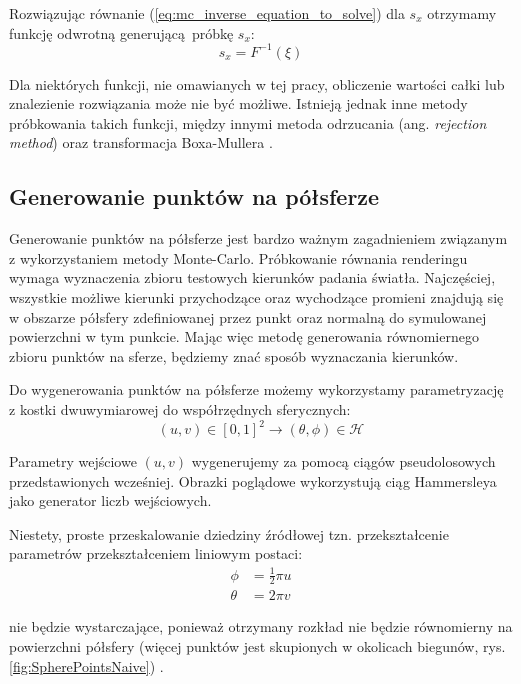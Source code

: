 \documentclass[../main.tex]{subfiles}
\begin{document}
Rozwiązując równanie (\ref{eq:mc_inverse_equation_to_solve}) dla $s_x$ otrzymamy funkcję odwrotną generującą próbkę $s_x$:
\begin{equation}
s_x = F^{-1}(\xi)
\end{equation}

Dla niektórych funkcji, nie omawianych w tej pracy, obliczenie wartości całki lub znalezienie rozwiązania może nie być możliwe. Istnieją jednak inne metody próbkowania takich funkcji, między innymi metoda odrzucania (ang. \textit{rejection method}) oraz transformacja Boxa-Mullera \cite{pbrt}.

\subsection{Generowanie punktów na półsferze}

Generowanie punktów na półsferze jest bardzo ważnym zagadnieniem związanym z wykorzystaniem metody Monte-Carlo. Próbkowanie równania renderingu wymaga wyznaczenia zbioru testowych kierunków padania światła. Najczęściej, wszystkie możliwe kierunki przychodzące oraz wychodzące promieni znajdują się w obszarze półsfery zdefiniowanej przez punkt oraz normalną do symulowanej powierzchni w tym punkcie. Mając więc metodę generowania równomiernego zbioru punktów na sferze, będziemy znać sposób wyznaczania kierunków.

Do wygenerowania punktów na półsferze możemy wykorzystamy parametryzację z kostki dwuwymiarowej do współrzędnych sferycznych:
\begin{equation}
  (u,v) \in [0,1]^2 \rightarrow (\theta, \phi) \in \mathcal{H}
\end{equation}

Parametry wejściowe $(u,v)$ wygenerujemy za pomocą ciągów pseudolosowych przedstawionych wcześniej. Obrazki poglądowe wykorzystują ciąg Hammersleya jako generator liczb wejściowych.

Niestety, proste przeskalowanie dziedziny źródłowej tzn. przekształcenie parametrów przekształceniem liniowym postaci:
\begin{equation}	
\begin{aligned}
    \phi &= \frac{1}{2} \pi u \\
    \theta &= 2 \pi v
\end{aligned}
\end{equation}

\noindent nie będzie wystarczające, ponieważ otrzymany rozkład nie będzie równomierny na powierzchni półsfery (więcej punktów jest skupionych w okolicach biegunów, rys. \ref{fig:SpherePointsNaive}) \cite{WolframSpherePointPicking}.
\end{document}

